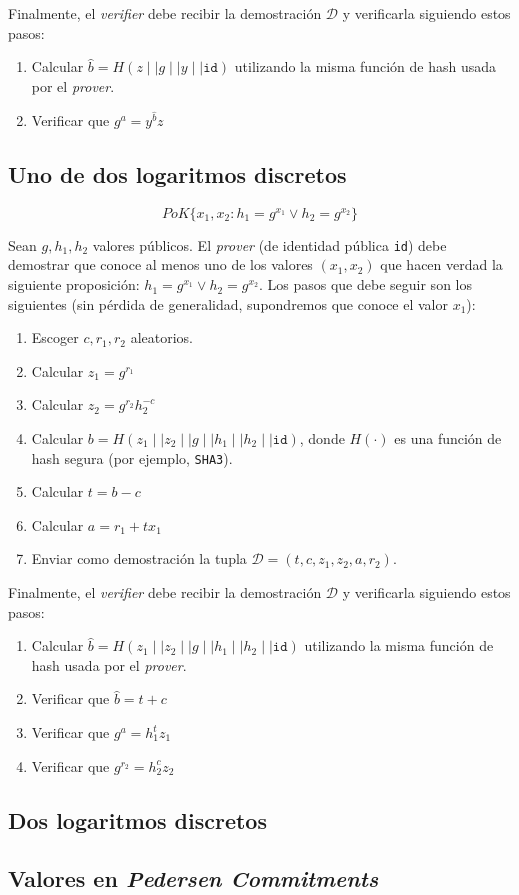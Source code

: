Finalmente, el \emph{verifier} debe recibir la demostración $\mathcal{D}$ y verificarla siguiendo estos pasos:
\begin{enumerate}
	\item Calcular $\hat{b} = H(z \mid\mid g \mid\mid y \mid\mid \mathtt{id})$ utilizando la misma función de hash usada por el \emph{prover}.
	\item Verificar que $g^a = y^{\hat{b}} z$
\end{enumerate} 

\subsection{Uno de dos logaritmos discretos}

$$PoK\{x_1, x_2 : h_1 = g^{x_1} \lor h_2 = g^{x_2}\}$$

Sean $g,h_1,h_2$ valores públicos. El \emph{prover} (de identidad pública \texttt{id}) debe demostrar que conoce al menos uno de los valores $(x_1,x_2)$ que hacen verdad la siguiente proposición: $h_1 = g^{x_1} \lor h_2 = g^{x_2}$. Los pasos que debe seguir son los siguientes (sin pérdida de generalidad, supondremos que conoce el valor $x_1$):
\begin{enumerate}
	\item Escoger $c, r_1, r_2$ aleatorios.
	\item Calcular $z_1 = g^{r_1}$
	\item Calcular $z_2 = g^{r_2} h_2^{-c}$
	\item Calcular $b = H(z_1 \mid\mid z_2 \mid\mid g \mid\mid h_1 \mid\mid h_2 \mid\mid \mathtt{id})$, donde $H(\cdot)$ es una función de hash segura (por ejemplo, \texttt{SHA3}).
	\item Calcular $t = b - c$
	\item Calcular $a = r_1 + t x_1$
	\item Enviar como demostración la tupla $\mathcal{D} = (t, c, z_1, z_2, a, r_2)$.
\end{enumerate}

Finalmente, el \emph{verifier} debe recibir la demostración $\mathcal{D}$ y verificarla siguiendo estos pasos:
\begin{enumerate}
	\item Calcular $\hat{b} = H(z_1 \mid\mid z_2 \mid\mid g \mid\mid h_1 \mid\mid h_2 \mid\mid \mathtt{id})$ utilizando la misma función de hash usada por el \emph{prover}.
	\item Verificar que $\hat{b} = t + c$
	\item Verificar que $g^a = h_1^t z_1$
	\item Verificar que $g^{r_2} = h_2^c z_2$
\end{enumerate} 

\subsection{Dos logaritmos discretos}

\subsection{Valores en \emph{Pedersen Commitments}}

